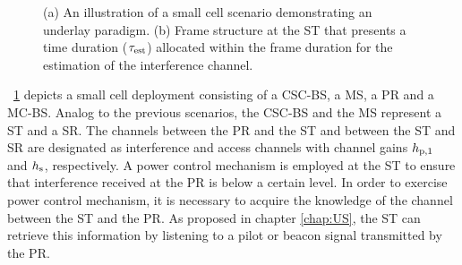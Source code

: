\begin{figure}
	\centering
	\caption{(a) An illustration of a small cell scenario demonstrating an underlay paradigm. (b) Frame structure at the ST that presents a time duration ($\tau_{\text{est}}$) allocated within the frame duration for the estimation of the interference channel.} 
	\label{szenarioA}
\end{figure}



\figurename~\ref{szenarioA} depicts a small cell deployment consisting of a CSC-BS, a MS, a PR and a MC-BS. Analog to the previous scenarios, the CSC-BS and the MS represent a ST and a SR. The channels between the PR and the ST and between the ST and SR are designated as interference and access channels with channel gains $h_{\text{p,1}}$ and $h_{\text{s}}$, respectively. A power control mechanism is employed at the ST to ensure that interference received at the PR is below a certain level. In order to exercise power control mechanism, it is necessary to acquire the knowledge of the channel between the ST and the PR. As proposed in chapter \ref{chap:US}, the ST can retrieve this information by listening to a pilot or beacon signal transmitted by the PR. %


